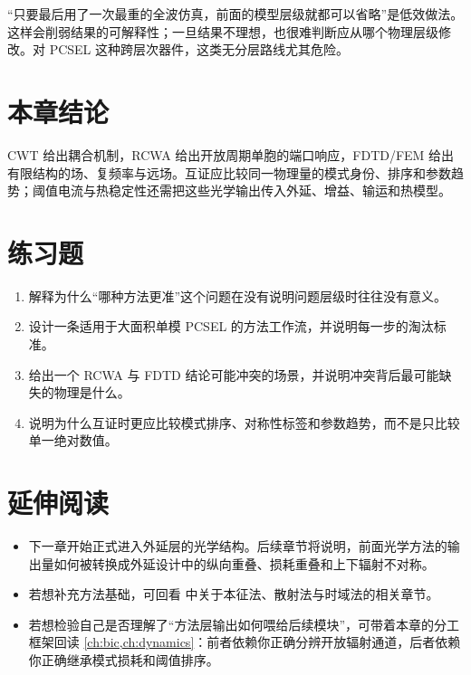 \begin{PitfallBox}
“只要最后用了一次最重的全波仿真，前面的模型层级就都可以省略”是低效做法。这样会削弱结果的可解释性；一旦结果不理想，也很难判断应从哪个物理层级修改。对 PCSEL 这种跨层次器件，这类无分层路线尤其危险。
\end{PitfallBox}

\section*{本章结论}
CWT 给出耦合机制，RCWA 给出开放周期单胞的端口响应，FDTD/FEM 给出有限结构的场、复频率与远场。互证应比较同一物理量的模式身份、排序和参数趋势；阈值电流与热稳定性还需把这些光学输出传入外延、增益、输运和热模型。

\section*{练习题}
\begin{enumerate}
  \item \basicq 解释为什么“哪种方法更准”这个问题在没有说明问题层级时往往没有意义。

  \item \basicq 设计一条适用于大面积单模 PCSEL 的方法工作流，并说明每一步的淘汰标准。

  \item \midq 给出一个 RCWA 与 FDTD 结论可能冲突的场景，并说明冲突背后最可能缺失的物理是什么。

  \item \hardq 说明为什么互证时更应比较模式排序、对称性标签和参数趋势，而不是只比较单一绝对数值。
\end{enumerate}

\section*{延伸阅读}
\begin{itemize}
  \item 下一章开始正式进入外延层的光学结构。后续章节将说明，前面光学方法的输出量如何被转换成外延设计中的纵向重叠、损耗重叠和上下辐射不对称。

  \item 若想补充方法基础，可回看 \cite{joannopoulos2008,taflove2005} 中关于本征法、散射法与时域法的相关章节。

  \item 若想检验自己是否理解了“方法层输出如何喂给后续模块”，可带着本章的分工框架回读 \cref{ch:bic,ch:dynamics}：前者依赖你正确分辨开放辐射通道，后者依赖你正确继承模式损耗和阈值排序。
\end{itemize}
